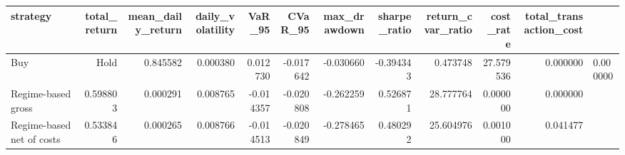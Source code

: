 \begin{tabular}{lrrrrrrrrrr}
\toprule
strategy & total_return & mean_daily_return & daily_volatility & VaR_95 & CVaR_95 & max_drawdown & sharpe_ratio & return_cvar_ratio & cost_rate & total_transaction_cost \\
\midrule
Buy & Hold & 0.845582 & 0.000380 & 0.012730 & -0.017642 & -0.030660 & -0.394343 & 0.473748 & 27.579536 & 0.000000 & 0.000000 \\
Regime-based gross & 0.598803 & 0.000291 & 0.008765 & -0.014357 & -0.020808 & -0.262259 & 0.526871 & 28.777764 & 0.000000 & 0.000000 \\
Regime-based net of costs & 0.533846 & 0.000265 & 0.008766 & -0.014513 & -0.020849 & -0.278465 & 0.480292 & 25.604976 & 0.001000 & 0.041477 \\
\bottomrule
\end{tabular}

